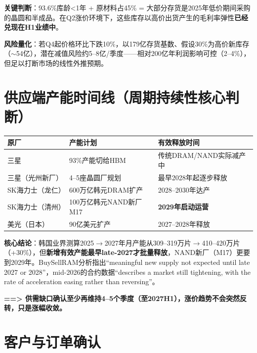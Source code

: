 \documentclass[a4paper,11pt,fontset=none]{ctexart}
\begin{document}
\textbf{关键判断}：93.6\%库龄<1年 + 原材料占45\% = 大部分存货是2025年低价期间采购的晶圆和半成品。在Q2涨价环境下，这些库存以高价出货产生的毛利率弹性\textbf{已经兑现在H1业绩中}。

\textbf{风险量化}：若Q4起价格环比下跌10\%，以179亿存货基数、假设30\%为高价新库存（$\sim$54亿），潜在减值风险约5--8亿/季度——相对200亿年利润影响可控（2--4\%），但足以打断市场的线性外推预期。

\section{供应端产能时间线（周期持续性核心判断）}

\begin{exhibitbox}
\begin{tabularx}{\textwidth}{L{2.5cm}L{3cm}X}
\toprule
\textbf{原厂} & \textbf{产能计划} & \textbf{有效释放时间} \\
\midrule
三星 & 93\%产能切给HBM & 传统DRAM/NAND实际减产中 \\
三星（光州新厂） & 4--5座晶圆厂规划 & 最早2028年起逐步释放 \\
SK海力士（龙仁） & 600万亿韩元DRAM扩产 & 2028--2030年达产 \\
SK海力士（清州） & 100万亿韩元NAND新厂M17 & \textbf{2029年启动运营} \\
美光（日本） & 90亿美元扩产 & 2027--2028年释放 \\
\bottomrule
\end{tabularx}
\end{exhibitbox}

\textbf{核心结论}：韩国业界测算2025$\to$2027年月产能从309--319万片$\to$410--420万片（+30\%），但\textbf{新增有效产能最早late-2027才批量释放}，NAND新厂（M17）更要到2029年。BuySellRAM分析指出``meaningful new supply not expected until late 2027 or 2028''，mid-2026的合约数据``describes a market still tightening, with the rate of acceleration easing rather than reversing''。

\textbf{==> 供需缺口确认至少再维持4--5个季度（至2027H1），涨价趋势不会突然反转，只是涨幅收敛。}

\section{客户与订单确认}
\end{document}
